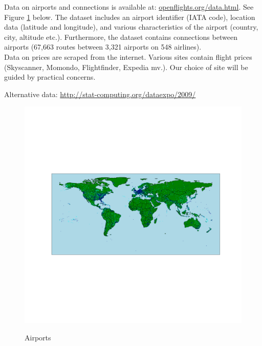 \label{sec:data}

Data on airports and connections is available at: \href{https://openflights.org/data.html}{openflights.org/data.html}. See Figure \ref{fig:airports} below. The dataset includes an airport identifier (IATA code), location data (latitude and longitude), and various characteristics of the airport (country, city, altitude etc.).
Furthermore, the dataset contains connections between airports (67,663 routes between 3,321 airports on 548 airlines). %
\medskip\\
Data on prices are scraped from the internet. Various sites contain flight prices (Skyscanner, Momondo, Flightfinder, Expedia mv.). Our choice of site will be guided by practical concerns.
\par
Alternative data:  \url{http://stat-computing.org/dataexpo/2009/}
\begin{figure}[H]
  \centering
  \caption{Airports}
    \includegraphics[width=1. \textwidth]{Exam/Airports_WorldMap}
  \label{fig:airports}
\end{figure}
